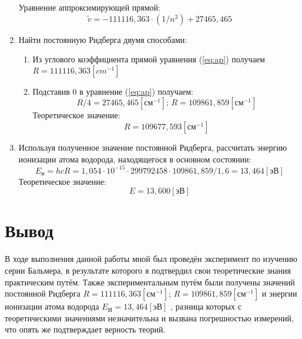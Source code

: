 \documentclass[12pt]{article}
\let\oldref\ref
\renewcommand{\ref}[1]{(\oldref{#1})}
\begin{document}
\begin{enumerate}[wide, labelwidth=!, labelindent=0pt]
        Уравнение аппроксимирующей прямой: 
        \begin{equation}
            \label{eq:ap}
            \widetilde{v} = -111116,363 \cdot (1/n^2) +27465,465
        \end{equation}
        \item Найти постоянную Ридберга двумя способами: 
        \begin{enumerate}
            \item Из углового коэффициента прямой уравнения \ref{eq:ap} получаем $ R =  111116,363 [cm^{-1}]$
            \item Подставив $ 0 $ в уравнение \ref{eq:ap} получаем:
            \begin{equation*}
                R/4 =  27465,465 [см^{-1}]                 
                ; \, R = 109861,859 [см^{-1}]
            \end{equation*}
            Теоретическое значение:
            \begin{equation*}
                R = 109677,593 [см^{-1}]
            \end{equation*}
        \end{enumerate}
        \item Используя  полученное  значение  постоянной  Ридберга, рассчитать энергию ионизации атома водорода, находящегося в основном состоянии:
        \begin{equation*}
            E_и = hcR =  1,054 \cdot 10^{-15} \cdot 299792458 \cdot 109861,859 / 1,6 = 13,464[эВ]
        \end{equation*}
        Теоретическое значение:
            \begin{equation*}
                E =  13,600[эВ] 
            \end{equation*}
    \end{enumerate}
    \section*{Вывод}
    В ходе выполнения данной работы мной был проведён эксперимент по изучению серии Бальмера, в результате которого я подтвердил свои теоретические знания практическим путём. Также экспериментальным путём были получены значений постоянной Ридберга 
    $ R = 111116,363[см^{-1}]; \,R = 109861,859 [см^{-1}]$
    и энергии ионизации атома водорода
    $ E_И = 13,464[эВ] $ 
    , разница которых с теоретическими значениями незначительна и вызвана погрешностью измерений, что опять же подтверждает верность теорий.  
\end{document}
